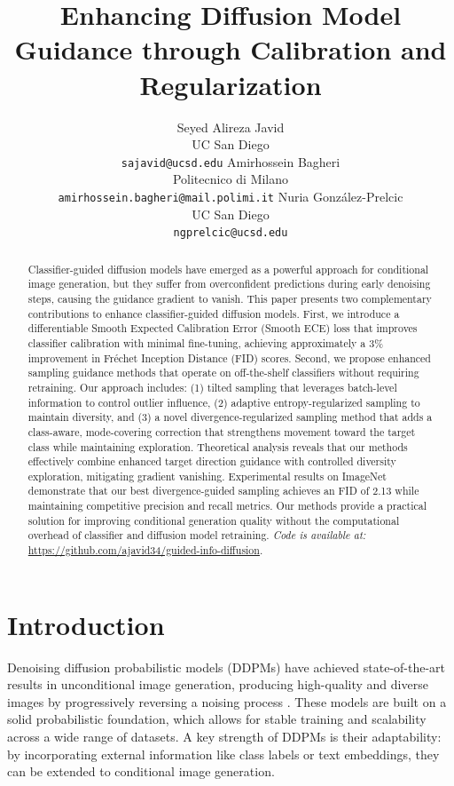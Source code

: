 \documentclass{article}
\title{Enhancing Diffusion Model Guidance through Calibration and  Regularization}
\author{%
  Seyed Alireza Javid \\
  UC San Diego\\
  \texttt{sajavid@ucsd.edu}
  \And
  Amirhossein Bagheri \\ %
  Politecnico di Milano\\
  \texttt{amirhossein.bagheri@mail.polimi.it}
  \And
  Nuria Gonz\'alez-Prelcic \\
  UC San Diego\\
  \texttt{ngprelcic@ucsd.edu}
}
\begin{document}
\maketitle


\begin{abstract}
Classifier-guided diffusion models have emerged as a powerful approach for conditional image generation, but they suffer from overconfident predictions during early denoising steps, causing the guidance gradient to vanish. This paper presents two complementary contributions to enhance classifier-guided diffusion models. First, we introduce a differentiable Smooth Expected Calibration Error (Smooth ECE) loss that improves classifier calibration with minimal fine-tuning, achieving approximately a 3\% improvement in Fréchet Inception Distance (FID) scores. Second, we propose enhanced sampling guidance methods that operate on off-the-shelf classifiers without requiring retraining. Our approach includes: (1) tilted sampling that leverages batch-level information to control outlier influence, (2) adaptive entropy-regularized sampling to maintain diversity, and (3) a novel divergence-regularized sampling method that adds a class-aware, mode-covering correction that strengthens movement toward the target class while maintaining exploration. Theoretical analysis reveals that our methods effectively combine enhanced
target direction guidance with controlled diversity exploration, mitigating gradient vanishing. Experimental results on ImageNet demonstrate that our best divergence-guided sampling achieves an FID of 2.13 while maintaining competitive precision and recall metrics. Our methods provide a practical solution for improving conditional generation quality without the computational overhead of classifier and diffusion model retraining. \textit{Code is available at:} \url{https://github.com/ajavid34/guided-info-diffusion}.
\end{abstract}




\section{Introduction}
Denoising diffusion probabilistic models (DDPMs) have achieved state-of-the-art results in unconditional image generation, producing high-quality and diverse images by progressively reversing a noising process \cite{ho2020denoising, nichol2021improved, song2020denoising}. These models are built on a solid probabilistic foundation, which allows for stable training and scalability across a wide range of datasets. A key strength of DDPMs is their adaptability: by incorporating external information like class labels or text embeddings, they can be extended to conditional image generation.
\end{document}

